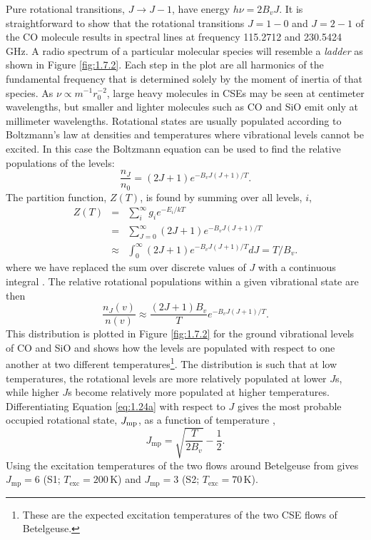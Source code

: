 Pure rotational transitions, $J\rightarrow J-1$, have energy $h\nu = 2B_{v}J$. It is straightforward to show that the rotational transitions $J=1-0$ and $J=2-1$ of the CO molecule results in spectral lines at frequency 115.2712 and 230.5424\,GHz. A radio spectrum of a particular molecular species will resemble a \textit{ladder} as shown in Figure \ref{fig:1.7.2}. Each step in the plot are all harmonics of the fundamental frequency that is determined solely by the moment of inertia of that species. As $\nu \propto m^{-1}r_{0}^{-2}$, large heavy molecules in CSEs may be seen at centimeter wavelengths, but smaller and lighter molecules such as CO and SiO emit only at millimeter wavelengths. 
Rotational states are usually populated according to Boltzmann's law at densities and temperatures where vibrational levels cannot be excited. In this case the Boltzmann equation can be used to find the relative populations of the levels:
\begin{equation}
\frac{n_{J}}{n_{0}}=(2J+1)e^{-B_{v}J(J+1)/T}.
\end{equation}\label{eq:1.20aa}
The partition function, $Z(T)$, is found by summing over all levels, $i$,
\begin{eqnarray}
Z(T) & = & \sum\limits_{i}^{\infty}g_{i}e^{-E_{i}/kT} \\
             & = & \sum\limits_{J=0}^{\infty}(2J+1)e^{-B_{v}J(J+1)/T} \\
              & \approx & \int ^{\infty} _{0}(2J+1)e^{-B_{v}J(J+1)/T} dJ =T/B_{v}.
\end{eqnarray}
where we have replaced the sum over discrete values of $J$ with a continuous integral \citep{shu_1991}. The relative rotational populations within a given vibrational state are then
\begin{equation}\label{eq:1.24a}
\dfrac{n_{J}(v)}{n(v)} \approx \frac{(2J+1)B_{v}}{T}e^{-B_{v}J(J+1)/T}.
\end{equation}
This distribution is plotted in Figure \ref{fig:1.7.2} for the ground vibrational levels of CO and SiO and shows how the levels are populated with respect to one another at two different temperatures\footnote{These are the expected excitation temperatures of the two CSE flows of Betelgeuse.}. The distribution is such that at low temperatures, the rotational levels are more relatively populated at lower $J$s, while higher $J$s become relatively more populated at higher temperatures. Differentiating Equation \ref{eq:1.24a} with respect to $J$
gives the most probable occupied rotational state, $J_{\rm{mp}}$, as a function of temperature \citep{rodgers_1991},
\begin{equation}
J_{\mathrm{mp}}=\sqrt{\frac{T}{2B_{v}}}-\frac{1}{2}.
\end{equation}
Using the excitation temperatures of the two flows around Betelgeuse from \cite{bernat_1979} gives $J_{\mathrm{mp}}=6$ (S1; $T_{\mathrm{exc}}=200$\,K) and $J_{\mathrm{mp}}=3$ (S2; $T_{\mathrm{exc}}=70$\,K).

